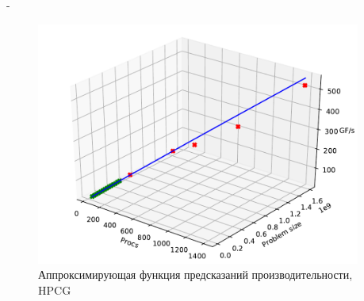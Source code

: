 \documentclass[unicode, t, 11pt]{beamer}%
\newlength{\mylen}
\begin{document}
\begin{frame}
\begin{columns}[T]
\begin{column}{\mylen}
		 			\end{column}
		 			\begin{column}{\dimexpr\textwidth-\mylen}
			 			\begin{figure}
							\captionsetup{font=tiny, labelfont=tiny}
							\includegraphics[width=\textwidth]{./images/bbb1}%
							\caption{Аппроксимирующая функция предсказаний производительности, HPCG}
						\end{figure}
					\end{column}
		 		\end{columns}
			\end{frame}
		
\end{document}
